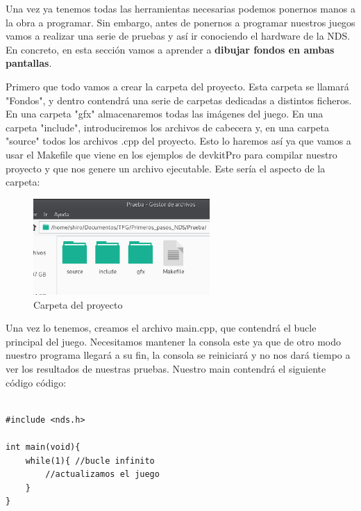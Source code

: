 Una vez ya tenemos todas las herramientas necesarias podemos ponernos manos a la obra a programar. Sin embargo, antes de ponernos a programar nuestros juegos vamos a realizar una serie de pruebas y así ir conociendo el hardware de la NDS. En concreto, en esta sección vamos a aprender a \textbf{dibujar fondos en ambas pantallas}.

\vspace{0.5cm}

Primero que todo vamos a crear la carpeta del proyecto. Esta carpeta se llamará "Fondos", y dentro contendrá una serie de carpetas dedicadas a distintos ficheros. En una carpeta "gfx" almacenaremos todas las imágenes del juego. En una carpeta "include", introduciremos los archivos de cabecera y, en una carpeta "source" todos los archivos .cpp del proyecto. Esto lo haremos así ya que vamos a usar el Makefile que viene en los ejemplos de devkitPro para compilar nuestro proyecto y que nos genere un archivo ejecutable. Este sería el aspecto de la carpeta:

\vspace{0.5cm}

\begin{figure}[htbp]
\centering
  \includegraphics[width=0.6\textwidth]{archivos/carpetas.png}
  \caption{Carpeta del proyecto}
  \label{fig:carpetas}
\end{figure}

\vspace{0.5cm}

Una vez lo tenemos, creamos el archivo main.cpp, que contendrá el bucle principal del juego. Necesitamos mantener la consola este ya que de otro modo nuestro programa llegará a su fin, la consola se reiniciará y no nos dará tiempo a ver los resultados de nuestras pruebas. Nuestro main contendrá el siguiente código código:

\begin{lstlisting}[caption={Bucle principal del juego}, label={code:gameloop}]

#include <nds.h>

int main(void){
    while(1){ //bucle infinito
        //actualizamos el juego
    }
}
\end{lstlisting}

